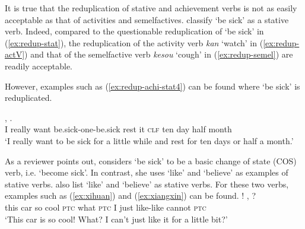 It is true that  the reduplication of stative and achievement verbs is not as easily acceptable as that of activities and semelfactives.
\citep[155]{XiaoMcEnery2004} classify  `be sick' as a stative verb.
Indeed, compared  to the questionable reduplication of  `be sick' in (\ref{ex:redup-stat}),  
 the reduplication of the activity verb \textit{kan} `watch' in (\ref{ex:redup-actV})
and that of the semelfactive verb \textit{kesou} `cough' in (\ref{ex:redup-semel}) are readily acceptable.

\settowidth{}

\ea
{}\label{ex:redup-stat}

\label{ex:redup-actV}

\label{ex:redup-semel}
\z
\z

However, examples such as (\ref{ex:redup-achi-stat4}) can be found where  `be sick' is reduplicated.

\ea\label{ex:redup-achi-stat4}
\gll {}   ,       .\\
I really want be.sick-one-be.sick rest it \textsc{clf} ten day half month\\ 
\glt `I really want to be sick for a little while and rest for ten days or half a month.'
\z

As a reviewer points out, \citet[Sec. 3.3]{Tham2013} considers   `be sick' to be a basic change of state (COS) verb, i.e. `become sick'.
In contrast, she uses  `like' and  `believe' as examples of stative verbs.
\citet[680]{PeckEtAl2013} also list  `like' and  `believe' as stative verbs.
For these two verbs, examples such as (\ref{ex:xihuan}) and (\ref{ex:xiangxin}) can be found.
\ea\label{ex:xihuan}%
\gll {}    !  ,     ?\\
this car so cool \textsc{ptc} what \textsc{ptc} I just like-like cannot \textsc{ptc}\\
\glt `This car is so cool! What? I can't just like it for a little bit?'


